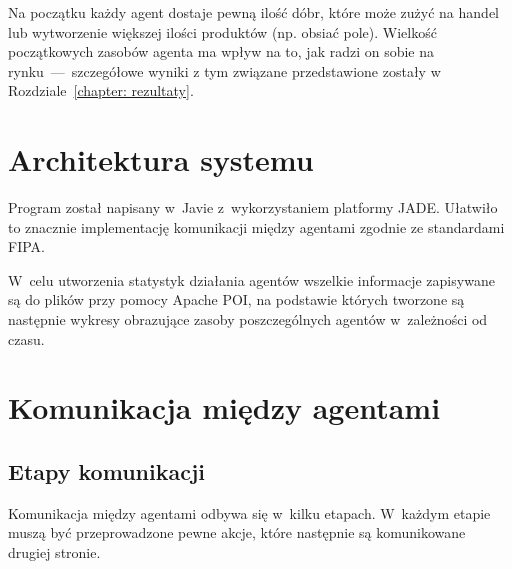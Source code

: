 \documentclass[12pt]{article}
\begin{document}
Na początku każdy agent dostaje pewną ilość dóbr, które może zużyć na handel lub wytworzenie większej ilości produktów (np. obsiać pole). Wielkość początkowych zasobów agenta ma wpływ na to, jak radzi on sobie
na rynku~---~szczegółowe wyniki z tym związane przedstawione zostały w Rozdziale~\ref{chapter: rezultaty}.

\section{Architektura systemu}
Program został napisany w~Javie z~wykorzystaniem platformy JADE. Ułatwiło to znacznie implementację komunikacji między agentami zgodnie ze standardami FIPA.

W~celu utworzenia statystyk działania agentów wszelkie informacje zapisywane są do plików przy pomocy Apache POI, na podstawie których tworzone są następnie wykresy obrazujące zasoby poszczególnych agentów w~zależności od czasu.

\section{Komunikacja między agentami}
\subsection{Etapy komunikacji}
Komunikacja między agentami odbywa się w~kilku etapach. W~każdym etapie muszą być przeprowadzone pewne akcje, które następnie są komunikowane drugiej stronie.
\end{document}
